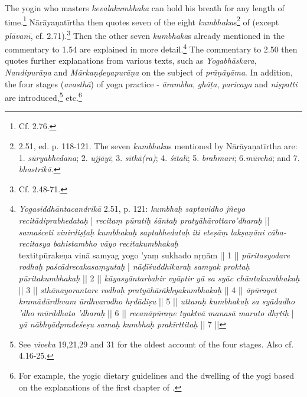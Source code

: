 The yogin who masters \textit{kevalakumbhaka} can hold his breath for any length of time.\footnote{Cf.  2.76.} Nārāyaṇatīrtha then quotes seven of the eight \textit{kumbhaka}s\footnote{ 2.51, ed. p. 118-121. The seven \textit{kumbhaka}s mentioned by Nārāyaṇatīrtha are: 1. \textit{sūryabhedana}; 2. \textit{ujjāyī}; 3. \textit{sītkā(ra)}; 4. \textit{śītalī}; 5. \textit{brahmarī}; 6.\textit{mūrchā}; and 7. \textit{bhastrikā}.} of  (except \textit{plāvanī}, cf.  2.71).\footnote{Cf.  2.48-71.} Then the other seven \textit{kumbhaka}s already mentioned in the commentary to 1.54 are explained in more detail.\footnote{\textit{Yogasiddhāntacandrikā} 2.51, p. 121: \textit{kumbhaḥ saptavidho jñeyo recitādiprabhedataḥ} | \textit{recitaṃ pūratiḥ śāntaḥ pratyāhārottaro'dharaḥ} || \textit{samaśceti vinirdiṣṭaḥ kumbhakaḥ saptabhedataḥ} \textit{iti eteṣāṃ lakṣaṇāni cāha-} \textit{recitasya bahistambho vāyo recitakumbhakaḥ} \\textit{pūrakeṇa vinā samyag yogo 'yaṃ sukhado nṛṇām} || 1 || \textit{pūritasyodare rodhaḥ paścādrecakasaṃyutaḥ} | \textit{nāḍīśuddhikaraḥ samyak proktaḥ pūritakumbhakaḥ} || 2 || \textit{kāyasyāntarbahir vyāptir yā sa syāc chāntakumbhakaḥ} || 3 || \textit{sthānayorantare rodhaḥ pratyāhārākhyakumbhakaḥ} || 4 || \textit{āpūrayet kramādūrdhvam ūrdhvarodho hṛdādiṣu} || 5 || \textit{uttaraḥ kumbhakaḥ sa syādadho 'dho mūrddhato 'dharaḥ} || 6 || \textit{recanāpūraṇe tyaktvā manasā maruto dhṛtiḥ} | \textit{yā nābhyādpradeśeṣu samaḥ kumbhaḥ prakīrttitaḥ} || 7 ||} The commentary to 2.50 then quotes further explanations from various texts, such as \textit{Yogabhāskara}, \textit{Nandipurāṇa} and \textit{Mārkaṇḍeyapurāṇa} on the subject of \textit{prāṇāyāma}. In addition, the four stages (\textit{avasthā}) of yoga practice - \textit{ārambha}, \textit{ghāṭa}, \textit{paricaya} and \textit{niṣpatti} are introduced,\footnote{See  \textit{viveka} 19,21,29 and 31 for the oldest account of the four stages. Also cf.  4.16-25.} etc.\footnote{For example, the yogic dietary guidelines and the dwelling of the yogi based on the explanations of the first chapter of .}

